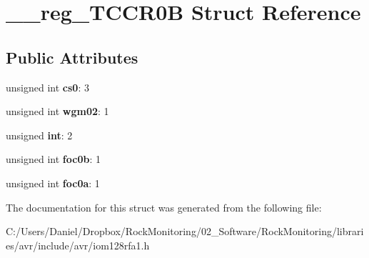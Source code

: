 \hypertarget{struct____reg___t_c_c_r0_b}{}\section{\+\_\+\+\_\+reg\+\_\+\+T\+C\+C\+R0B Struct Reference}
\label{struct____reg___t_c_c_r0_b}
\subsection*{Public Attributes}
\begin{DoxyCompactItemize}
\item 
unsigned int {\bfseries cs0}\+: 3\hypertarget{struct____reg___t_c_c_r0_b_a4b43d2ca48e2e4681a455d6255f8c864}{}\label{struct____reg___t_c_c_r0_b_a4b43d2ca48e2e4681a455d6255f8c864}

\item 
unsigned int {\bfseries wgm02}\+: 1\hypertarget{struct____reg___t_c_c_r0_b_a0280449c03f22a8b8641a6dfb1bd7678}{}\label{struct____reg___t_c_c_r0_b_a0280449c03f22a8b8641a6dfb1bd7678}

\item 
unsigned {\bfseries int}\+: 2\hypertarget{struct____reg___t_c_c_r0_b_a82e224b448458e32876bc7c8c10ca12a}{}\label{struct____reg___t_c_c_r0_b_a82e224b448458e32876bc7c8c10ca12a}

\item 
unsigned int {\bfseries foc0b}\+: 1\hypertarget{struct____reg___t_c_c_r0_b_acabe16ba261a665f73547469aa39e779}{}\label{struct____reg___t_c_c_r0_b_acabe16ba261a665f73547469aa39e779}

\item 
unsigned int {\bfseries foc0a}\+: 1\hypertarget{struct____reg___t_c_c_r0_b_ae9092736561f90ef3e8fd039b308cd9f}{}\label{struct____reg___t_c_c_r0_b_ae9092736561f90ef3e8fd039b308cd9f}

\end{DoxyCompactItemize}


The documentation for this struct was generated from the following file\+:\begin{DoxyCompactItemize}
\item 
C\+:/\+Users/\+Daniel/\+Dropbox/\+Rock\+Monitoring/02\+\_\+\+Software/\+Rock\+Monitoring/libraries/avr/include/avr/iom128rfa1.\+h\end{DoxyCompactItemize}
